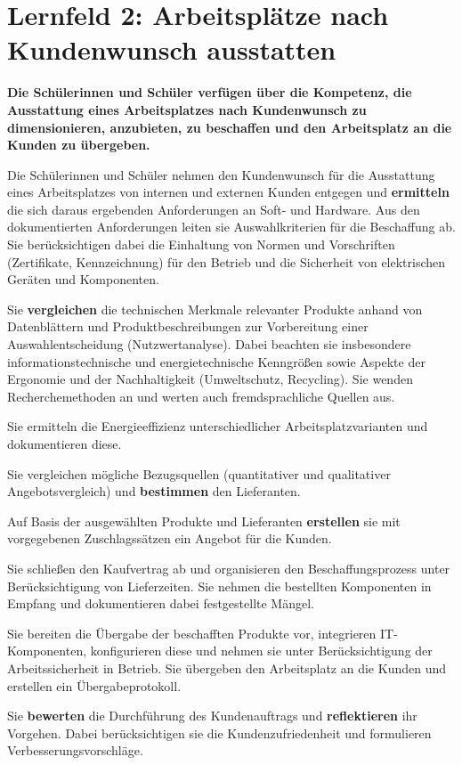 \chapter{Lernfeld 2: Arbeitsplätze nach Kundenwunsch ausstatten}

\textbf{Die Schülerinnen und Schüler verfügen über die Kompetenz, die Ausstattung eines
    Arbeitsplatzes nach Kundenwunsch zu dimensionieren, anzubieten, zu beschaffen
    und den Arbeitsplatz an die Kunden zu übergeben.}

Die Schülerinnen und Schüler nehmen den Kundenwunsch für die Ausstattung eines Arbeitsplatzes von internen und externen Kunden entgegen und \textbf{ermitteln} die sich daraus
ergebenden Anforderungen an Soft- und Hardware. Aus den dokumentierten Anforderungen leiten sie Auswahlkriterien für die Beschaffung ab. Sie berücksichtigen dabei die Einhaltung von Normen und Vorschriften (Zertifikate, Kennzeichnung) für den Betrieb und die
Sicherheit von elektrischen Geräten und Komponenten.

Sie \textbf{vergleichen} die technischen Merkmale relevanter Produkte anhand von Datenblättern
und Produktbeschreibungen zur Vorbereitung einer Auswahlentscheidung (Nutzwertanalyse). Dabei beachten sie insbesondere informationstechnische und energietechnische
Kenngrößen sowie Aspekte der Ergonomie und der Nachhaltigkeit (Umweltschutz, Recycling). Sie wenden Recherchemethoden an und werten auch fremdsprachliche Quellen aus.

Sie ermitteln die Energieeffizienz unterschiedlicher Arbeitsplatzvarianten und dokumentieren diese.

Sie vergleichen mögliche Bezugsquellen (quantitativer und qualitativer Angebotsvergleich)
und \textbf{bestimmen} den Lieferanten.

Auf Basis der ausgewählten Produkte und Lieferanten \textbf{erstellen} sie mit vorgegebenen Zuschlagssätzen ein Angebot für die Kunden.

Sie schließen den Kaufvertrag ab und organisieren den Beschaffungsprozess unter Berücksichtigung von Lieferzeiten. Sie nehmen die bestellten Komponenten in Empfang und dokumentieren dabei festgestellte Mängel.

Sie bereiten die Übergabe der beschafften Produkte vor, integrieren IT-Komponenten, konfigurieren diese und nehmen sie unter Berücksichtigung der Arbeitssicherheit in Betrieb. Sie
übergeben den Arbeitsplatz an die Kunden und erstellen ein Übergabeprotokoll.

Sie \textbf{bewerten} die Durchführung des Kundenauftrags und \textbf{reflektieren} ihr Vorgehen. Dabei
berücksichtigen sie die Kundenzufriedenheit und formulieren Verbesserungsvorschläge.






